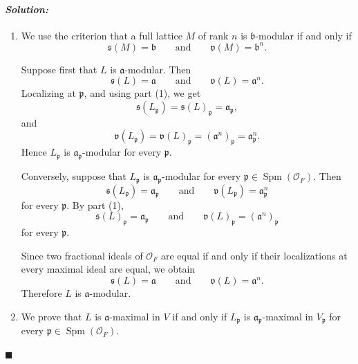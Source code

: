 \documentclass[12pt, a4paper]{article}
\newenvironment{solution}
  {\paragraph{\textit{Solution:}}\par\medskip}
  {\hfill$\blacksquare$\vspace{0.1cm}}
\begin{document}
\begin{solution}
\begin{enumerate}
Localizing at \(\mathfrak p\), we get
\[
L_{\mathfrak p}
=
(\mathfrak a_1)_{\mathfrak p}e_1+\cdots+
(\mathfrak a_n)_{\mathfrak p}e_n .
\]
Since \(\mathcal O_{\mathfrak p}\) is a DVR, every fractional ideal
\((\mathfrak a_i)_{\mathfrak p}\) is principal. Choose
\[
(\mathfrak a_i)_{\mathfrak p}=\alpha_i\mathcal O_{\mathfrak p}.
\]
Then
\[
\alpha_1e_1,\dots,\alpha_ne_n
\]
is an \(\mathcal O_{\mathfrak p}\)-basis of \(L_{\mathfrak p}\). Hence
\[
\mathfrak v(L_{\mathfrak p})
=
\det\bigl(B(\alpha_i e_i,\alpha_j e_j)\bigr)\mathcal O_{\mathfrak p}.
\]
But
\[
\det\bigl(B(\alpha_i e_i,\alpha_j e_j)\bigr)
=
(\alpha_1\cdots \alpha_n)^2\det(B(e_i,e_j)).
\]
Therefore
\[
\mathfrak v(L_{\mathfrak p})
=
(\mathfrak a_1)_{\mathfrak p}^2\cdots
(\mathfrak a_n)_{\mathfrak p}^2
\det(B(e_i,e_j))\mathcal O_{\mathfrak p}
=
\mathfrak v(L)_{\mathfrak p}.
\]

    \item We use the criterion that a full lattice \(M\) of rank \(n\) is
\(\mathfrak b\)-modular if and only if
\[
\mathfrak s(M)=\mathfrak b
\qquad\text{and}\qquad
\mathfrak v(M)=\mathfrak b^n .
\]

Suppose first that \(L\) is \(\mathfrak a\)-modular. Then
\[
\mathfrak s(L)=\mathfrak a
\qquad\text{and}\qquad
\mathfrak v(L)=\mathfrak a^n.
\]
Localizing at \(\mathfrak p\), and using part (1), we get
\[
\mathfrak s(L_{\mathfrak p})
=
\mathfrak s(L)_{\mathfrak p}
=
\mathfrak a_{\mathfrak p},
\]
and
\[
\mathfrak v(L_{\mathfrak p})
=
\mathfrak v(L)_{\mathfrak p}
=
(\mathfrak a^n)_{\mathfrak p}
=
\mathfrak a_{\mathfrak p}^n.
\]
Hence \(L_{\mathfrak p}\) is \(\mathfrak a_{\mathfrak p}\)-modular for every
\(\mathfrak p\).

Conversely, suppose that \(L_{\mathfrak p}\) is
\(\mathfrak a_{\mathfrak p}\)-modular for every
\(\mathfrak p\in \operatorname{Spm}(\mathcal O_F)\). Then
\[
\mathfrak s(L_{\mathfrak p})=\mathfrak a_{\mathfrak p}
\qquad\text{and}\qquad
\mathfrak v(L_{\mathfrak p})=\mathfrak a_{\mathfrak p}^n
\]
for every \(\mathfrak p\). By part (1),
\[
\mathfrak s(L)_{\mathfrak p}=\mathfrak a_{\mathfrak p}
\qquad\text{and}\qquad
\mathfrak v(L)_{\mathfrak p}=(\mathfrak a^n)_{\mathfrak p}
\]
for every \(\mathfrak p\).

Since two fractional ideals of \(\mathcal O_F\) are equal if and only if their
localizations at every maximal ideal are equal, we obtain
\[
\mathfrak s(L)=\mathfrak a
\qquad\text{and}\qquad
\mathfrak v(L)=\mathfrak a^n.
\]
Therefore \(L\) is \(\mathfrak a\)-modular.

    \item We prove that \(L\) is \(\mathfrak a\)-maximal in \(V\) if and only if
\(L_{\mathfrak p}\) is \(\mathfrak a_{\mathfrak p}\)-maximal in
\(V_{\mathfrak p}\) for every
\(\mathfrak p\in \operatorname{Spm}(\mathcal O_F)\).


\end{enumerate}
\end{solution}
\end{document}

